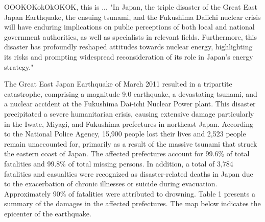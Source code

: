 \documentclass[12pt,halfline,a4paper]{ouparticle}
\begin{document}
OOOKOKokOkOKOK, this is ... "In Japan, the triple disaster of the Great East Japan Earthquake, the ensuing tsunami, and the Fukushima Daiichi nuclear crisis will have enduring implications on public perceptions of both local and national government authorities, as well as specialists in relevant fields. Furthermore, this disaster has profoundly reshaped attitudes towards nuclear energy, highlighting its risks and prompting widespread reconsideration of its role in Japan's energy strategy."




The Great East Japan Earthquake of March 2011 resulted in a tripartite catastrophe, comprising a magnitude 9.0 earthquake, a devastating tsunami, and a nuclear accident at the Fukushima Dai-ichi Nuclear Power plant. This disaster precipitated a severe humanitarian crisis, causing extensive damage particularly in the Iwate, Miyagi, and Fukushima prefectures in northeast Japan. According to the National Police Agency, 15,900 people lost their lives and 2,523 people remain unaccounted for, primarily as a result of the
massive tsunami that struck the eastern coast of Japan. The affected
prefectures account for 99.6\% of total fatalities and 99.8\% of total missing persons. In addition, a total of 3,784 fatalities and casualties were recognized as disaster-related deaths in Japan due to the exacerbation of chronic illnesses or suicide during evacuation. Approximately 90\% of fatalities were attributed to drowning. Table 1 presents a summary of the damages in the affected prefectures. The map below indicates the epicenter of the earthquake.
\end{document}
